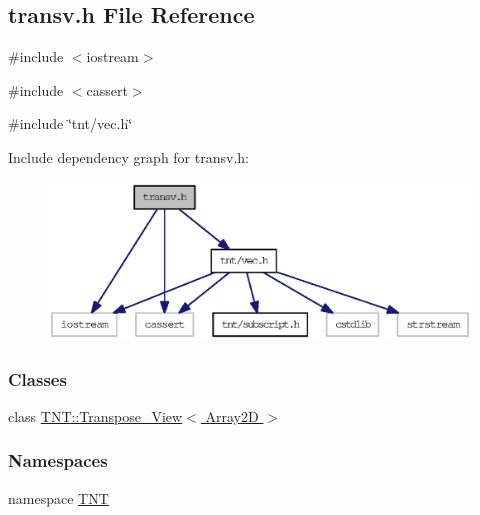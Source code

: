 \subsection{transv.h File Reference}
\label{transv_8h}
{\ttfamily \#include $<$iostream$>$}\par
{\ttfamily \#include $<$cassert$>$}\par
{\ttfamily \#include \char`\"{}tnt/vec.h\char`\"{}}\par
Include dependency graph for transv.h:
\nopagebreak
\begin{figure}[H]
\begin{center}
\leavevmode
\includegraphics[width=400pt]{transv_8h__incl}
\end{center}
\end{figure}
\subsubsection*{Classes}
\begin{DoxyCompactItemize}
\item 
class \hyperlink{class_t_n_t_1_1_transpose___view}{TNT::Transpose\_\-View$<$ Array2D $>$}
\end{DoxyCompactItemize}
\subsubsection*{Namespaces}
\begin{DoxyCompactItemize}
\item 
namespace \hyperlink{namespace_t_n_t}{TNT}
\end{DoxyCompactItemize}
